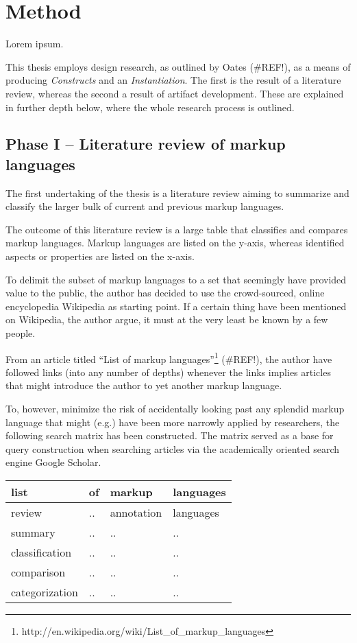 \documentclass{scrreprt}
\begin{document}
\chapter{Method}
Lorem ipsum.

This thesis employs design research, as outlined by Oates (\#REF!), as a means of producing \emph{Constructs} and an \emph{Instantiation}. The first is the result of a literature review, whereas the second a result of artifact development. These are explained in further depth below, where the whole research process is outlined.


\section{Phase I -- Literature review of markup languages}
The first undertaking of the thesis is a literature review aiming to summarize and classify the larger bulk of current and previous markup languages.

The outcome of this literature review is a large table that classifies and compares markup languages. Markup languages are listed on the y-axis, whereas identified aspects or properties are listed on the x-axis.

To delimit the subset of markup languages to a set that seemingly have provided value to the public, the author has decided to use the crowd-sourced, online encyclopedia Wikipedia as starting point. If a certain thing have been mentioned on Wikipedia, the author argue, it must at the very least be known by a few people.

From an article titled ``List of markup languages''\footnote{http://en.wikipedia.org/wiki/List\_of\_markup\_languages} (\#REF!), the author have followed links (into any number of depths) whenever the links implies articles that might introduce the author to yet another markup language.

To, however, minimize the risk of accidentally looking past any splendid markup language that might (e.g.) have been more narrowly applied by researchers, the following search matrix has been constructed. The matrix served as a base for query construction when searching articles via the academically oriented search engine Google Scholar.

\vspace{6pt}
\begin{tabular}{ |l|l|l|l| }
  \hline
  list            & of & markup     & languages \\\hline
  review          & ..   & annotation & languages \\\hline
  summary         & ..   & .. & .. \\\hline
  classification  & ..   & .. & .. \\\hline
  comparison      & ..   & .. & .. \\\hline
  categorization  & ..   & .. & .. \\\hline
\end{tabular}
\vspace{6pt}
\end{document}
